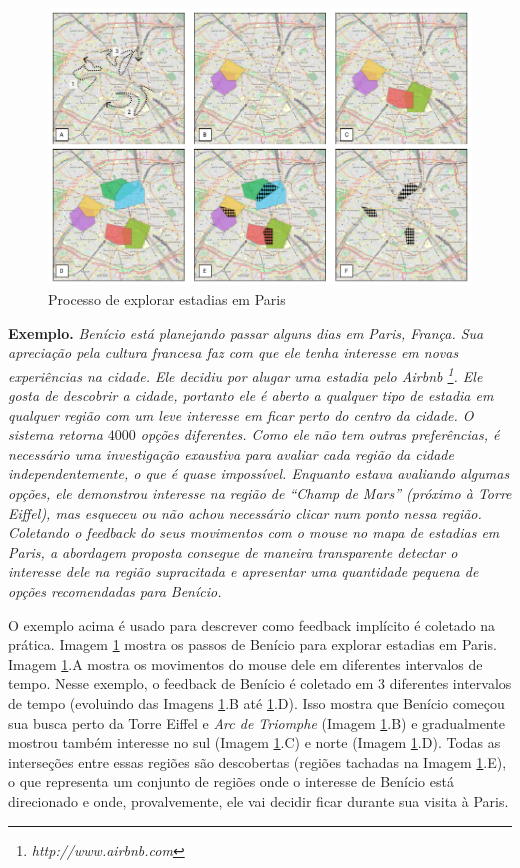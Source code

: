 \begin{figure}[t]
	\centering
	\includegraphics[width=\textwidth]{imagens/caso-de-estudo}
	\caption{Processo de explorar estadias em Paris}
	\label{fig:regions}
\end{figure}

{\bf Exemplo.} {\em Benício está planejando passar alguns dias em Paris, França. Sua apreciação pela cultura francesa faz com que ele tenha interesse em novas experiências na cidade. Ele decidiu por alugar uma estadia pelo Airbnb \footnote{\it http://www.airbnb.com}. Ele gosta de descobrir a cidade, portanto ele é aberto a qualquer tipo de estadia em qualquer região com um leve interesse em ficar perto do centro da cidade. O sistema retorna $4000$ opções diferentes. Como ele não tem outras preferências, é necessário uma investigação exaustiva para avaliar cada região da cidade independentemente, o que é quase impossível. Enquanto estava avaliando algumas opções, ele demonstrou interesse na região de  ``Champ de Mars'' (próximo à Torre Eiffel), mas esqueceu ou não achou necessário clicar num ponto nessa região. Coletando o feedback do seus movimentos com o mouse no mapa de estadias em Paris, a abordagem proposta consegue de maneira transparente detectar o interesse dele na região supracitada e apresentar uma quantidade pequena de opções recomendadas para Benício.}

O exemplo acima é usado para descrever como feedback implícito é coletado na prática. Imagem \ref{fig:regions} mostra os passos de Benício para explorar estadias em Paris. Imagem \ref{fig:regions}.A mostra os movimentos do mouse dele em diferentes intervalos de tempo. Nesse exemplo, o feedback de Benício é coletado em 3 diferentes intervalos de tempo (evoluindo das Imagens \ref{fig:regions}.B até \ref{fig:regions}.D). Isso mostra que Benício começou sua busca perto da Torre Eiffel e {\em Arc de Triomphe} (Imagem \ref{fig:regions}.B) e gradualmente mostrou também interesse no sul (Imagem \ref{fig:regions}.C) e norte (Imagem \ref{fig:regions}.D). Todas as interseções entre essas regiões são descobertas (regiões tachadas na Imagem \ref{fig:regions}.E), o que representa um conjunto de regiões onde o interesse de Benício está direcionado e onde, provalvemente, ele vai decidir ficar durante sua visita à Paris.

